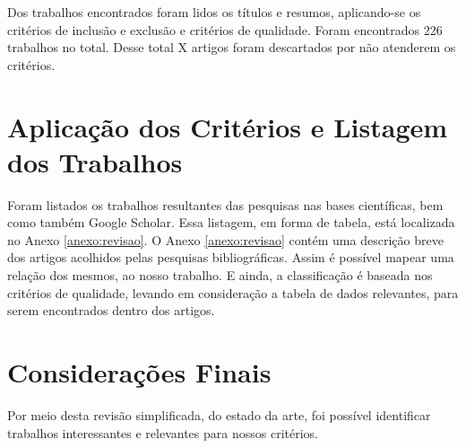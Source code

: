 \begin{table}[!htb]
\caption{Extração de resultados pela \gls{ACM}}
\begin{center}
{
\footnotesize
{}
}
\end{center}
\label{tab:extracao-ACM}
\end{table}

Dos trabalhos encontrados foram lidos os títulos e resumos, aplicando-se os critérios de inclusão e exclusão e critérios de qualidade. Foram encontrados 226 trabalhos no total. Desse total X artigos foram descartados por não atenderem os critérios.

\section{Aplicação dos Critérios e Listagem dos Trabalhos}

Foram listados os trabalhos resultantes das pesquisas nas bases científicas, bem como também Google Scholar. Essa listagem, em forma de tabela, está localizada no Anexo \ref{anexo:revisao}. O Anexo \ref{anexo:revisao} contém uma descrição breve dos artigos acolhidos pelas pesquisas bibliográficas. Assim é possível mapear uma relação dos mesmos, ao nosso trabalho. E ainda, a classificação é baseada nos critérios de qualidade, levando em consideração a tabela de dados relevantes, para serem encontrados dentro dos artigos.

\section{Considerações Finais}

Por meio desta revisão simplificada, do estado da arte, foi possível identificar trabalhos interessantes e relevantes para nossos critérios.
